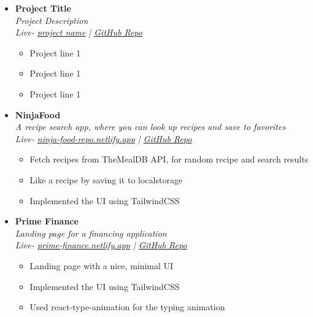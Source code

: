 \documentclass[11pt, oneside, a4paper, titlepage]{article}
\begin{document}
\begin{tcolorbox}
\begin{minipage}[t]{11cm}
\begin{tcolorbox}[grow to right by=0.75cm,colframe=white,colback=white]
\begin{itemize}
        \item
        {
          \textbf{Project Title} \\
          \textit{Project Description} \\
          \textit{Live- \href{url}{\underline{project name}} | \href{https://github.com/SazedWorldbringer}{\underline{GitHub Repo}}} \\
          \vspace*{-0.7cm}
          \begin{itemize}
            \item Project line 1
            \item Project line 1
            \item Project line 1
          \end{itemize}
        }

        \item
        {
          \textbf{NinjaFood} \\
          \textit{A recipe search app, where you can look up recipes and save to favorites} \\
          \textit{Live- \href{https://ninja-food-repo.netlify.app}{\underline{ninja-food-repo.netlify.app}} | \href{https://github.com/SazedWorldbringer/ninjafood}{\underline{GitHub Repo}}} \\
          \vspace*{-0.7cm}
          \begin{itemize}
            \item Fetch recipes from TheMealDB API, for random recipe and search results
            \item Like a recipe by saving it to localstorage
            \item Implemented the UI using TailwindCSS
          \end{itemize}
        }

        \item
        {
          \textbf{Prime Finance} \\
          \textit{Landing page for a financing application} \\
          \textit{Live- \href{https://prime-finance.netlify.app}{\underline{prime-finance.netlify.app}} | \href{https://github.com/SazedWorldbringer/prime-finance-react}{\underline{GitHub Repo}}} \\
          \vspace*{-0.7cm}
          \begin{itemize}
            \item Landing page with a nice, minimal UI
            \item Implemented the UI using TailwindCSS
            \item Used react-type-animation for the typing animation
          \end{itemize}
        }


\end{itemize}
\end{tcolorbox}
\end{minipage}
\end{tcolorbox}
\end{document}
